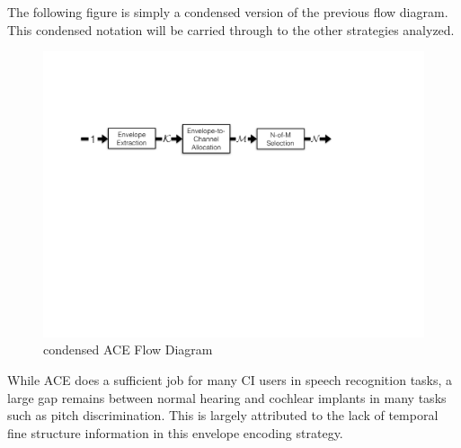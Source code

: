\documentclass [11pt, proquest,oneside] {ganter_thesis}[2015/03/03]
\begin{document}
The following figure is simply a condensed version of the previous flow diagram.  This condensed notation will be carried through to the other strategies analyzed.

\begin{figure}[!ht]
  \centering
    \includegraphics[width=1\textwidth]{ACE_flow_diagram}   
    \caption{condensed ACE Flow Diagram}\label{fig:ace_flow_diagram}
\end{figure}

While ACE does a sufficient job for many CI users in speech recognition tasks, a large gap remains between normal hearing and cochlear implants in many tasks such as pitch discrimination.  This is largely attributed to the lack of temporal fine structure information in this envelope encoding strategy.


\end{document}
